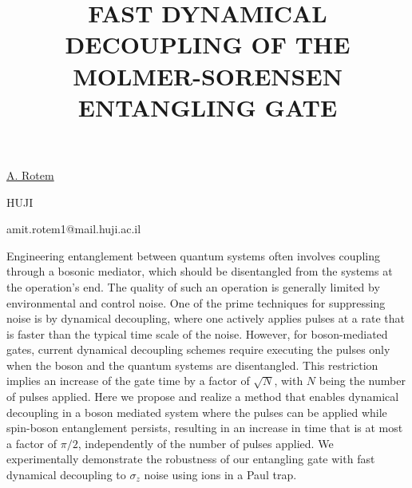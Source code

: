 \title{FAST DYNAMICAL DECOUPLING OF THE MOLMER-SORENSEN ENTANGLING GATE}

\underline{A. Rotem}  

{\normalsize{\vspace{-4mm}
HUJI



\email amit.rotem1@mail.huji.ac.il}}

Engineering entanglement between quantum systems often involves coupling through a bosonic mediator, which should be disentangled from the systems at the operation's end. The quality of such an operation is generally limited by environmental and control noise. One of the prime techniques for suppressing noise is by dynamical decoupling, where one actively applies pulses at a rate that is faster than the typical time scale of the noise.  However, for boson-mediated gates, current dynamical decoupling schemes require executing the pulses only when the boson and the quantum systems are disentangled. This restriction implies an increase of the gate time by a factor of $\sqrt{N}$, with $N$ being the number of pulses applied. Here we propose and realize a method that enables dynamical decoupling in a boson mediated system where the pulses can be applied while spin-boson entanglement persists, resulting in an increase in time that is at most a factor of $\pi/2$, independently of the number of pulses applied. We experimentally demonstrate the robustness of our entangling gate with fast dynamical decoupling to $\sigma_z$ noise using ions in a Paul trap.

\vspace{\baselineskip}
